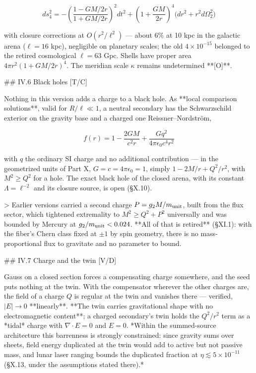 $$ds^2_4 = -\left(\frac{1-GM/2r}{1+GM/2r}\right)^2dt^2 + \left(1+\frac{GM}{2r}\right)^4\big(dr^2+r^2d\Omega_2^2\big)$$

with closure corrections at $O(r^2/\ell^2)$ — about $6\%$ at 10 kpc in the galactic arena ($\ell = 16$ kpc), negligible on planetary scales; the old $4\times10^{-15}$ belonged to the retired cosmological $\ell = 63$ Gpc. Shells have proper area $4\pi r^2(1+GM/2r)^4$. The meridian scale $\kappa$ remains undetermined **[O]**.

## IV.6 Black holes [T/C]

Nothing in this version adds a charge to a black hole. As **local comparison solutions**, valid for $R/\ell\ll1$, a neutral secondary has the Schwarzschild exterior on the gravity base and a charged one Reissner–Nordström,

$$f(r) = 1 - \frac{2GM}{c^2r} + \frac{Gq^2}{4\pi\epsilon_0c^4r^2}$$

with $q$ the ordinary SI charge and no additional contribution — in the geometrized units of Part X, $G = c = 4\pi\epsilon_0 = 1$, simply $1-2M/r+Q^2/r^2$, with $M^2\geq Q^2$ for a hole. The exact black hole of the closed arena, with its constant $\Lambda = \ell^{-2}$ and its closure source, is open (§X.10).

> Earlier versions carried a second charge $P = g_2M/m_{\rm unit}$, built from the flux sector, which tightened extremality to $M^2\geq Q^2+P^2$ universally and was bounded by Mercury at $g_2/m_{\rm unit}<0.024$. **All of that is retired** (§XI.1): with the fiber's Chern class fixed at $\pm1$ by spin geometry, there is no mass-proportional flux to gravitate and no parameter to bound.

## IV.7 Charge and the twin [V/D]

Gauss on a closed section forces a compensating charge somewhere, and the seed puts nothing at the twin. With the compensator wherever the other charges are, the field of a charge $Q$ is regular at the twin and vanishes there — verified, $|E|\to0$ **linearly**. **The twin carries gravitational shape with no electromagnetic content**; a charged secondary's twin holds the $Q^2/r^2$ term as a *tidal* charge with $\nabla\cdot E = 0$ and $E = 0$. *Within the summed-source architecture this barrenness is strongly constrained: since gravity sums over sheets, field energy duplicated at the twin would add to active but not passive mass, and lunar laser ranging bounds the duplicated fraction at $\eta\lesssim5\times10^{-11}$ (§X.13, under the assumptions stated there).*

